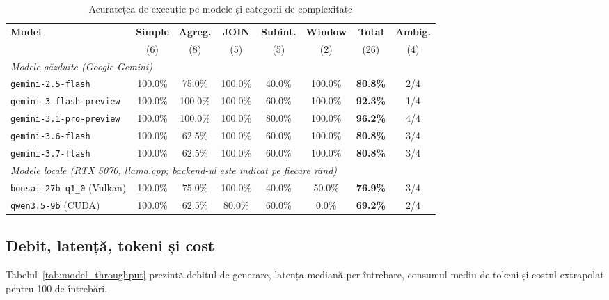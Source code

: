 \documentclass[12pt, a4paper]{report}
\newcommand{\code}[1]{\texttt{#1}}
\begin{document}
\begin{table}[H]
\centering
\caption{Acuratețea de execuție pe modele și categorii de complexitate}
\label{tab:model_accuracy}
\begin{tabular}{l c c c c c c c}
\toprule
\textbf{Model} & \textbf{Simple} & \textbf{Agreg.} & \textbf{JOIN} & \textbf{Subint.} & \textbf{Window} & \textbf{Total} & \textbf{Ambig.} \\
 & (6) & (8) & (5) & (5) & (2) & (26) & (4) \\
\midrule
\multicolumn{8}{l}{\emph{Modele găzduite (Google Gemini)}} \\
\code{gemini-2.5-flash} & 100.0\% & 75.0\% & 100.0\% & 40.0\% & 100.0\% & \textbf{80.8\%} & 2/4 \\
\code{gemini-3-flash-preview} & 100.0\% & 100.0\% & 100.0\% & 60.0\% & 100.0\% & \textbf{92.3\%} & 1/4 \\
\code{gemini-3.1-pro-preview} & 100.0\% & 100.0\% & 100.0\% & 80.0\% & 100.0\% & \textbf{96.2\%} & 4/4 \\
\code{gemini-3.6-flash} & 100.0\% & 62.5\% & 100.0\% & 60.0\% & 100.0\% & \textbf{80.8\%} & 3/4 \\
\code{gemini-3.7-flash} & 100.0\% & 62.5\% & 100.0\% & 60.0\% & 100.0\% & \textbf{80.8\%} & 3/4 \\
\midrule
\multicolumn{8}{l}{\emph{Modele locale (RTX 5070, llama.cpp; backend-ul este indicat pe fiecare rând)}} \\
\code{bonsai-27b-q1\_0} (Vulkan) & 100.0\% & 75.0\% & 100.0\% & 40.0\% & 50.0\% & \textbf{76.9\%} & 3/4 \\
\code{qwen3.5-9b} (CUDA) & 100.0\% & 62.5\% & 80.0\% & 60.0\% & 0.0\% & \textbf{69.2\%} & 2/4 \\
\bottomrule
\end{tabular}
\end{table}

\subsection{Debit, latență, tokeni și cost}

Tabelul~\ref{tab:model_throughput} prezintă debitul de generare, latența mediană
per întrebare, consumul mediu de tokeni și costul extrapolat pentru 100 de
întrebări.
\end{document}
